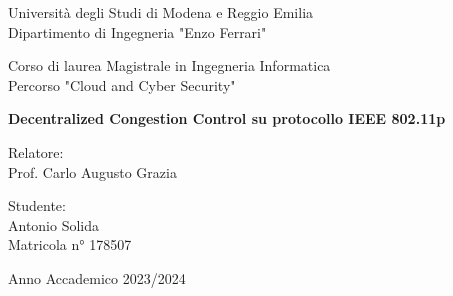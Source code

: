 \thispagestyle{plain}

\begin{titlepage}
    \begin{center}

		Università degli Studi di Modena e Reggio Emilia\\
		\large
		Dipartimento di Ingegneria "Enzo Ferrari"

        \vspace{2.5cm}
        
		\Large
		Corso di laurea Magistrale in Ingegneria Informatica\\
		
		\large
		Percorso "Cloud and Cyber Security"		
		
		\vspace{2.5cm}
        
        \Huge
        \textbf{Decentralized Congestion Control su protocollo IEEE 802.11p}

        \vspace{2cm}

		\Large 
        \begin{flushleft}
        Relatore:\\
        Prof. Carlo Augusto Grazia
        \end{flushleft}
                
        \begin{flushleft}
        \end{flushleft}
        
        \vspace{1cm}
        
        \large
		\begin{flushright}
		Studente:\\
		Antonio Solida\\
        Matricola n° 178507
		\end{flushright}
        
		\vfill
		
		\small
		Anno Accademico 2023/2024
            
    \end{center}
\end{titlepage}